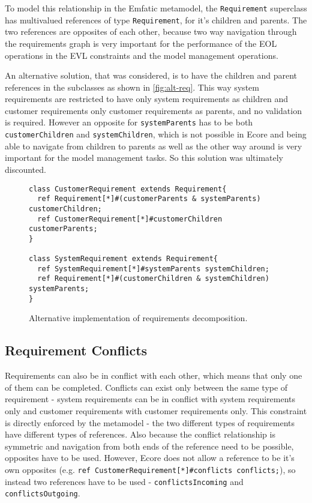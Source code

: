 \documentclass[11pt,a4paper]{article}
\begin{document}
	To model this relationship in the Emfatic metamodel, the \texttt{Requirement} superclass has multivalued references of type \texttt{Requirement}, for it's children and parents. The two references are opposites of each other, because two way navigation through the requirements graph is very important for the performance of the EOL operations in the EVL constraints and the model management operations.
	
	An alternative solution, that was considered, is to have the children and parent references in the subclasses as shown in \autoref{fig:alt-req}. This way system requirements are restricted to have only system requirements as children and customer requirements only customer requirements as parents, and no validation is required. However an opposite for \texttt{systemParents} has to be both \texttt{customerChildren} and \texttt{systemChildren}, which is not possible in Ecore and being able to navigate from children to parents as well as the other way around is very important for the model management tasks. So this solution was ultimately discounted.
	
	\begin{figure}[h!]
	\begin{framed}
	\centering
	\begin{lstlisting}
class CustomerRequirement extends Requirement{
  ref Requirement[*]#(customerParents & systemParents) customerChildren;
  ref CustomerRequirement[*]#customerChildren customerParents;
}
	
class SystemRequirement extends Requirement{
  ref SystemRequirement[*]#systemParents systemChildren;
  ref Requirement[*]#(customerChildren & systemChildren) systemParents;
}
	\end{lstlisting}
	
	\caption{Alternative implementation of requirements decomposition.}
	\label{fig:alt-req}
\end{framed}
	\end{figure}
	

	\subsection{Requirement Conflicts}
	Requirements can also be in conflict with each other, which means that only one of them can be completed. Conflicts can exist only between the same type of requirement - system requirements can be in conflict with system requirements only and customer requirements with customer requirements only. This constraint is directly enforced by the metamodel - the two different types of requirements have different types of references. Also because the conflict relationship is symmetric and navigation from both ends of the reference need to be possible, opposites have to be used. However, Ecore does not allow a reference to be it's own opposites \cite{selfopposite} (e.g. \texttt{ref CustomerRequirement[*]\#conflicts conflicts;}), so instead two references have to be used - \texttt{conflictsIncoming} and \texttt{conflictsOutgoing}.
	
\end{document}
